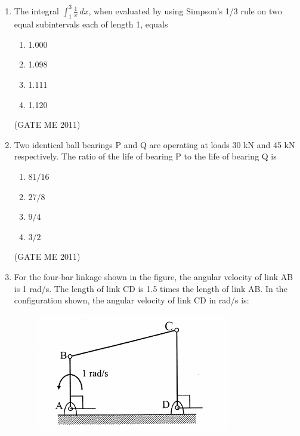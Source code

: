 \documentclass[journal]{IEEEtran}
\begin{document}
\begin{enumerate}
\item The integral $\int_1^3 \frac{1}{x}\,dx$, when evaluated by using Simpson's 1/3 rule on two equal subintervals each of length 1, equals
\begin{multicols}{4}
\begin{enumerate}
\item 1.000  
\item 1.098  
\item 1.111  
\item 1.120  
\end{enumerate}
\end{multicols}  
\hfill (GATE ME 2011)  

\item Two identical ball bearings P and Q are operating at loads 30 kN and 45 kN respectively. The ratio of the life of bearing P to the life of bearing Q is
\begin{multicols}{4}
\begin{enumerate}
\item $81/16$  
\item $27/8$  
\item $9/4$  
\item $3/2$  
\end{enumerate}
\end{multicols}  
\hfill (GATE ME 2011)  

\item For the four-bar linkage shown in the figure, the angular velocity of link AB is 1 rad/s. The length of link CD is 1.5 times the length of link AB. In the configuration shown, the angular velocity of link CD in rad/s is:

\begin{figure}[H]
    \centering
    \includegraphics[width=0.8\textwidth]{Fig 6.png}
    \caption{}
    \label{fig:question31}
\end{figure}


\end{enumerate}
\end{document}
